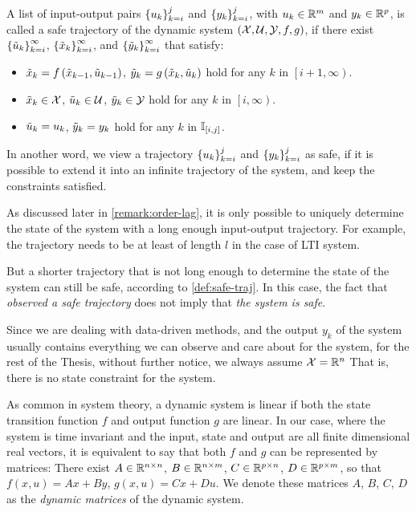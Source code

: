 \begin{definition}\label{def:safe-traj}
    A list of input-output pairs $\left\{u_k\right\}_{k=i}^{j}$ and $\left\{y_k\right\}_{k=i}^{j}$, with $u_k \in \mathbb{R}^m$ and $y_k \in \mathbb{R}^p$, is called a safe trajectory of the dynamic system $\left(\mathcal{X}, \mathcal{U}, \mathcal{Y}, f, g\right)$, if there exist $\left\{\tilde{u}_k\right\}_{k=i}^{\infty}$, $\left\{\tilde{x}_k\right\}_{k=i}^{\infty}$, and $\left\{\tilde{y}_k\right\}_{k=i}^{\infty}$ that satisfy:

    \begin{itemize}
        \item $\tilde{x}_k = f\left(\tilde{x}_{k-1}, \tilde{u}_{k-1}\right)$, $\tilde{y}_k = g\left(\tilde{x}_k, \tilde{u}_k\right)$ hold for any $k$ in $\left[i+1, \infty\right)$.
        \item $\tilde{x}_k \in \mathcal{X}$, $\tilde{u}_k \in \mathcal{U}$, $\tilde{y}_k \in \mathcal{Y}$ hold for any $k$ in $\left[i, \infty\right)$.
        \item $\tilde{u}_k = u_k$, $\tilde{y}_k = y_k$ hold for any $k$ in $\mathbb{I}_{\left[ i, j \right]}$.
    \end{itemize}

\end{definition}

In another word, we view a trajectory $\left\{u_k\right\}_{k=i}^{j}$ and $\left\{y_k\right\}_{k=i}^{j}$ as safe, if it is possible to extend it
into an infinite trajectory of the system, and keep the constraints satisfied.

\begin{remark}\label{remark:safe-traj}
    As discussed later in \cref{remark:order-lag}, it is only possible to uniquely determine the state of the system with a long enough input-output trajectory.
    For example, the trajectory needs to be at least of length $l$ in the case of LTI system.

    But a shorter trajectory that is not long enough to determine the state of the system can still be safe, according to \cref{def:safe-traj}.
    In this case, the fact that \emph{observed a safe trajectory} does not imply that \emph{the system is safe}.
\end{remark}

Since we are dealing with data-driven methods, and the output $y_k$ of the system usually contains everything we can observe and care about for the system, for the rest of the Thesis, without further notice, we always assume $\mathcal{X} = \mathbb{R}^n$
That is, there is no state constraint for the system.

As common in system theory, a dynamic system is linear if both the state transition function $f$ and output function $g$ are linear.
In our case, where the system is time invariant and the input, state and output are all finite dimensional real vectors, it is equivalent to say that both $f$ and $g$ can be represented by matrices:
There exist $A \in \mathbb{R}^{n \times n}$, $B \in \mathbb{R}^{n \times m}$, $C \in \mathbb{R}^{p \times n}$, $D \in \mathbb{R}^{p \times m}$, so that $f\left(x,u\right) = A x + B y$, $g\left(x, u\right) = C x + D u$.
We denote these matrices $A$, $B$, $C$, $D$ as the \emph{dynamic matrices} of the dynamic system.

